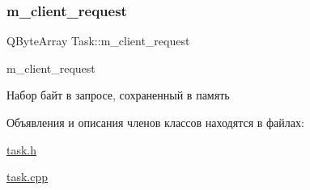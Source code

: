 \subsubsection{\texorpdfstring{m\+\_\+client\+\_\+request}{m\_client\_request}}
{\footnotesize\ttfamily Q\+Byte\+Array Task\+::m\+\_\+client\+\_\+request\hspace{0.3cm}{\ttfamily [private]}}



m\+\_\+client\+\_\+request 

Набор байт в запросе, сохраненный в память 

Объявления и описания членов классов находятся в файлах\+:\begin{DoxyCompactItemize}
\item 
\hyperlink{task_8h}{task.\+h}\item 
\hyperlink{task_8cpp}{task.\+cpp}\end{DoxyCompactItemize}
